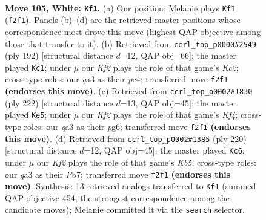 \documentclass[11pt]{article}
\begin{document}
\clearpage

\begin{figure}[p]\centering
\begin{subfigure}{0.46\textwidth}\centering
\resizebox{\linewidth}{!}{%
\newchessgame
\chessboard[
  setfen={1k6/3R4/8/8/p7/q7/5K1r/8 w - - 4 105},
  showmover=false,
  pgfstyle=straightmove, color=movearrow, markmove={f2-f1}
]}
\caption{}
\end{subfigure}\hfill
\begin{subfigure}{0.46\textwidth}\centering
\resizebox{\linewidth}{!}{%
\newchessgame
\chessboard[
  setfen={8/3P4/8/2k5/2p5/8/r1K5/6R1 w - - 12 97},
  showmover=false,
  pgfstyle=straightmove, color=movearrow, markmove={c2-c1}
]}
\caption{}
\end{subfigure}
\\[4pt]
\begin{subfigure}{0.46\textwidth}\centering
\resizebox{\linewidth}{!}{%
\newchessgame
\chessboard[
  setfen={8/6k1/R5p1/8/5K2/7P/8/5r2 w - - 8 112},
  showmover=false,
  pgfstyle=straightmove, color=movearrow, markmove={f4-e5}
]}
\caption{}
\end{subfigure}\hfill
\begin{subfigure}{0.46\textwidth}\centering
\resizebox{\linewidth}{!}{%
\newchessgame
\chessboard[
  setfen={8/1P3p2/4k3/1K6/8/3R4/1r6/8 w - - 1 111},
  showmover=false,
  pgfstyle=straightmove, color=movearrow, markmove={b5-c6}
]}
\caption{}
\end{subfigure}
\caption{\textbf{Move 105, White: \texttt{Kf1}.} (a) Our position; Melanie plays \texttt{Kf1} (\texttt{f2f1}). Panels (b)--(d) are the retrieved master positions whose correspondence most drove this move (highest QAP objective among those that transfer to it). (b) Retrieved from \texttt{ccrl\_top\_p0000\#2549} (ply 192) [structural distance $d$=12, QAP obj=66]: the master played \texttt{Kc1}; under $\mu$ our \emph{Kf2} plays the role of that game's \emph{Kc2}; cross-type roles: our \emph{q}a3 as their \emph{p}c4; transferred move \texttt{f2f1} \textbf{(endorses this move)}. (c) Retrieved from \texttt{ccrl\_top\_p0002\#1830} (ply 222) [structural distance $d$=13, QAP obj=45]: the master played \texttt{Ke5}; under $\mu$ our \emph{Kf2} plays the role of that game's \emph{Kf4}; cross-type roles: our \emph{q}a3 as their \emph{p}g6; transferred move \texttt{f2f1} \textbf{(endorses this move)}. (d) Retrieved from \texttt{ccrl\_top\_p0002\#1385} (ply 220) [structural distance $d$=12, QAP obj=45]: the master played \texttt{Kc6}; under $\mu$ our \emph{Kf2} plays the role of that game's \emph{Kb5}; cross-type roles: our \emph{q}a3 as their \emph{P}b7; transferred move \texttt{f2f1} \textbf{(endorses this move)}. Synthesis: 13 retrieved analogs transferred to \texttt{Kf1} (summed QAP objective 454, the strongest correspondence among the candidate moves); Melanie committed it via the \texttt{search} selector.}
\label{fig:thought-m208}
\end{figure}
\end{document}
